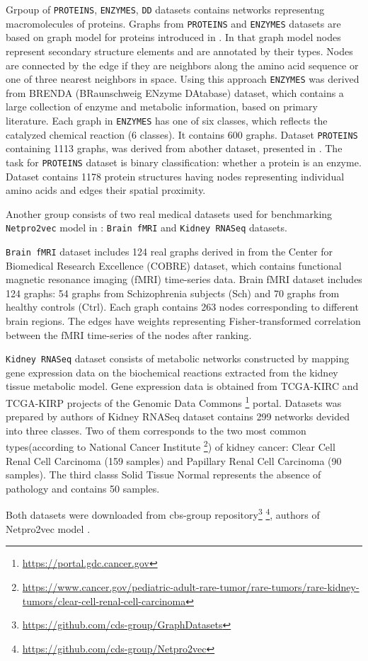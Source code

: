Grpoup of \texttt{PROTEINS}, \texttt{ENZYMES}, \texttt{DD} datasets contains networks
representng macromolecules of proteins. Graphs from \texttt{PROTEINS} and \texttt{ENZYMES} datasets
are based on  graph model for proteins introduced in \cite{ProteinBased}.
In that graph model nodes represent secondary structure elements and are annotated by their types.
Nodes are connected by the edge if they are neighbors along the amino acid sequence or one of three nearest neighbors in
space. Using this approach \texttt{ENZYMES} was derived from BRENDA (BRaunschweig ENzyme DAtabase)\cite{Brenda} dataset, which
contains a large collection of enzyme and metabolic information, based on primary literature. Each graph in \texttt{ENZYMES}
has one of six classes, which reflects the catalyzed chemical reaction (6 classes). It contains 600 graphs. Dataset \texttt{PROTEINS} containing
1113 graphs, was derived  from abother dataset, presented in \cite{ProtBase2}. The task for \texttt{PROTEINS} dataset is binary classification:
whether a protein is an enzyme. Dataset \cite{DD} contains 1178 protein structures having nodes representing
individual amino acids and edges their spatial proximity.

Another group consists of two real medical datasets used for benchmarking \texttt{Netpro2vec} model in \cite{Netpro2vec}: \texttt{Brain fMRI} and
\texttt{Kidney RNASeq} datasets.

\texttt{Brain fMRI} dataset includes 124 real graphs derived in \cite{BrainFmri} from the Center for Biomedical Research Excellence (COBRE) dataset, which contains
functional magnetic resonance imaging (fMRI) time-series data. Brain fMRI dataset includes 124 graphs: 54 graphs from Schizophrenia subjects (Sch) and 70 graphs from
healthy controls (Ctrl). Each graph contains 263 nodes corresponding to different brain regions. The edges have weights representing Fisher-transformed correlation between
the fMRI time-series of the nodes after ranking.

\texttt{Kidney RNASeq} dataset consists of metabolic networks constructed by mapping gene expression data on the biochemical reactions
extracted from the kidney tissue metabolic model. Gene expression data is obtained from TCGA-KIRC and TCGA-KIRP projects
of the Genomic Data Commons \footnote{\url{https://portal.gdc.cancer.gov}} portal. Datasets was prepared by authors of \cite{Netpro2vec}
Kidney RNASeq dataset contains 299 networks devided into three classes. Two of them corresponds to the two most common types(according to National Cancer Institute \footnote{\url{https://www.cancer.gov/pediatric-adult-rare-tumor/rare-tumors/rare-kidney-tumors/clear-cell-renal-cell-carcinoma}})
of kidney cancer: Clear Cell Renal Cell Carcinoma (159 samples) and Papillary Renal Cell Carcinoma (90 samples). The third classs Solid Tissue Normal represents the absence of pathology
and contains 50 samples.

Both datasets were downloaded from cbs-group repository\footnote{\url{https://github.com/cds-group/GraphDatasets}} \footnote{\url{https://github.com/cds-group/Netpro2vec}}, authors of Netpro2vec model \cite{Netpro2vec}.
